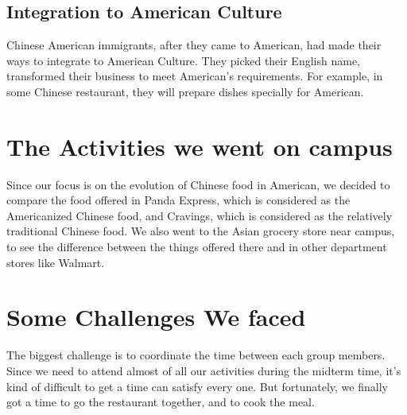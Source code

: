 \documentclass[a4paper,20pt,openany]{article}
\begin{document}
\subsection{Integration to American Culture}
Chinese American immigrants, after they came to American, had made their ways to
integrate to American Culture. They picked their English name, transformed their
business to meet American's requirements. For example, in some Chinese
restaurant, they will prepare dishes specially for American.

\section{The Activities we went on campus}
Since our focus is on the evolution of Chinese food in American, we decided
to compare the food offered in Panda Express, which is considered as the
Americanized Chinese food, and Cravings, which is considered as the
relatively traditional Chinese food. 
We also went to the Asian grocery store near campus, to see the difference
between the things offered there and in other department stores like Walmart.

\section{Some Challenges We faced}
The biggest challenge is to coordinate the time between each group members.
Since we need to attend almost of all our activities during the midterm time,
it's kind of difficult to get a time can satisfy every one. But fortunately, we
finally got a time to go the restaurant together, and to cook the meal.



\end{document}
